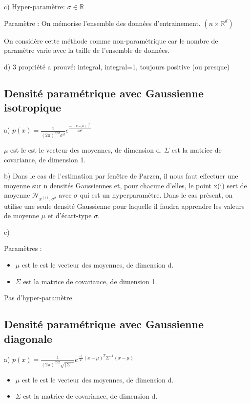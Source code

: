 \documentclass[a4paper,10pt]{article}
\begin{document}
c) Hyper-paramètre: $\sigma \in \mathds{R}$

Paramètre : On mémorise l'ensemble des données d'entrainement. $( n \times \mathds{R}^{d})$

On considère cette méthode comme non-paramétrique car le nombre de paramètre varie avec la taille de l'ensemble de données.



d)
3 propriété a prouvé: integral, integral=1, toujours positive (ou presque)

\subsection{Densité paramétrique avec Gaussienne isotropique}

a) $p(x) = \frac{1}{(2 \pi)^{d/2} \sigma^{d}} e^{\frac{-\mid\mid x- \mu \mid\mid ^{2}}{2 \sigma^{2}} }$


$\mu$ est le est le vecteur des moyennes, de dimension d.
$\Sigma$ est la matrice de covariance, de dimension 1.



b) Dans le cas de l'estimation par fenêtre de Parzen, il nous faut effectuer une moyenne sur n densités Gaussiennes et, pour chacune d'elles, le point x(i) sert de moyenne $\mathcal{N}_{x^{(i)}, \sigma^{2}}$ avec $\sigma$ qui est un hyperparamètre. Dans le cas présent, on utilise une seule densité Gaussienne pour laquelle il faudra apprendre les valeurs de moyenne $\mu$ et d'écart-type $\sigma$.

c)

Paramètres :
\begin{itemize}
	\item $\mu$ est le est le vecteur des moyennes, de dimension d.
	\item $\Sigma$ est la matrice de covariance, de dimension 1.
\end{itemize}

Pas d'hyper-paramètre.


\subsection{Densité paramétrique avec Gaussienne diagonale}

a) $p(x) = \frac{1}{(2 \pi)^{d/2} \sqrt{\mid{\Sigma} \mid}} e^{\frac{-1}{2} (x- \mu)^{T} \Sigma^{-1} (x- \mu) }$
\begin{itemize}
	\item $\mu$ est le est le vecteur des moyennes, de dimension d.
	\item $\Sigma$ est la matrice de covariance, de dimension d.
\end{itemize}
\end{document}
